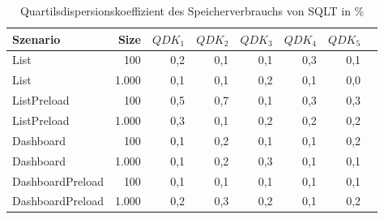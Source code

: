 
\begin{table}[ht]
\setlength{\extrarowheight}{-1pt}
\centering
\caption{Quartilsdispersionskoeffizient des Speicherverbrauchs von SQLT in \%}
\begin{tabular}{lrrrrrrr}
\toprule
Szenario & Size & ${QDK_1}$ & ${QDK_2}$ & ${QDK_3}$& ${QDK_4}$ & ${QDK_5}$ \\
\midrule
	List & 100 & \cellcolor{red!1}  0,2 & \cellcolor{red!1}  0,1 & \cellcolor{red!1}  0,1 & \cellcolor{red!1}  0,3 & \cellcolor{red!1}  0,1 \\
	List & 1.000 & \cellcolor{red!1}  0,1 & \cellcolor{red!1}  0,1 & \cellcolor{red!1}  0,2 & \cellcolor{red!1}  0,1 & \cellcolor{red!1}  0,0 \\
	ListPreload & 100 & \cellcolor{red!1}  0,5 & \cellcolor{red!1}  0,7 & \cellcolor{red!1}  0,1 & \cellcolor{red!1}  0,3 & \cellcolor{red!1}  0,3 \\
	ListPreload & 1.000 & \cellcolor{red!1}  0,3 & \cellcolor{red!1}  0,1 & \cellcolor{red!1}  0,2 & \cellcolor{red!1}  0,2 & \cellcolor{red!1}  0,2 \\
	Dashboard & 100 & \cellcolor{red!1}  0,1 & \cellcolor{red!1}  0,2 & \cellcolor{red!1}  0,1 & \cellcolor{red!1}  0,1 & \cellcolor{red!1}  0,2 \\
	Dashboard & 1.000 & \cellcolor{red!1}  0,1 & \cellcolor{red!1}  0,2 & \cellcolor{red!1}  0,3 & \cellcolor{red!1}  0,1 & \cellcolor{red!1}  0,1 \\
	DashboardPreload & 100 & \cellcolor{red!1}  0,1 & \cellcolor{red!1}  0,1 & \cellcolor{red!1}  0,1 & \cellcolor{red!1}  0,1 & \cellcolor{red!1}  0,1 \\
	DashboardPreload & 1.000 & \cellcolor{red!1}  0,2 & \cellcolor{red!1}  0,3 & \cellcolor{red!1}  0,2 & \cellcolor{red!1}  0,1 & \cellcolor{red!1}  0,2 \\
\bottomrule
\end{tabular}
\label{tab:quartilsdispersionskoeffizient_speicherverbrauch_sqlt}
\end{table}
	